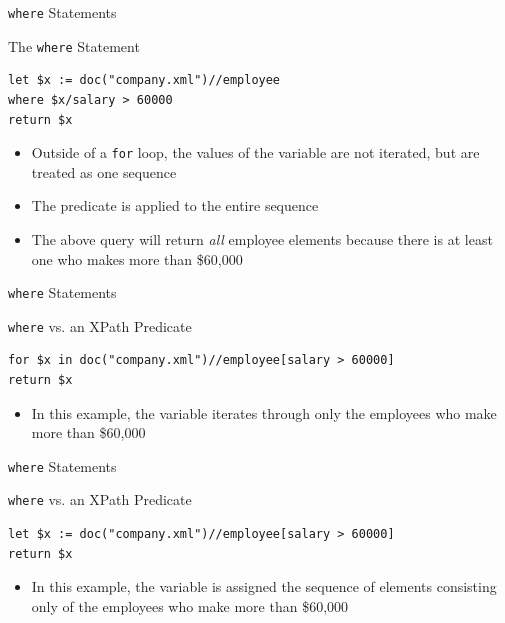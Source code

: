 \documentclass[svgnames]{beamer}
\begin{document}
\begin{frame}[fragile]{\texttt{where} Statements}
\small
\begin{block}{The \texttt{where} Statement}
\begin{verbatim}
let $x := doc("company.xml")//employee
where $x/salary > 60000
return $x
\end{verbatim}
\end{block}
\normalsize
\begin{itemize}
	\item Outside of a \texttt{for} loop, the values of the variable are not iterated, but are treated as one sequence
	\item The predicate is applied to the entire sequence
	\item The above query will return \textit{all} employee elements because there is at least one who makes more than \$60,000
\end{itemize}
\end{frame}

\begin{frame}[fragile]{\texttt{where} Statements}
\small
\begin{block}{\texttt{where} vs. an XPath Predicate}
\begin{verbatim}
for $x in doc("company.xml")//employee[salary > 60000]
return $x
\end{verbatim}
\end{block}
\normalsize
\begin{itemize}
	\item In this example, the variable iterates through only the employees who make more than \$60,000
\end{itemize}
\end{frame}

\begin{frame}[fragile]{\texttt{where} Statements}
\small
\begin{block}{\texttt{where} vs. an XPath Predicate}
\begin{verbatim}
let $x := doc("company.xml")//employee[salary > 60000]
return $x
\end{verbatim}
\end{block}
\normalsize
\begin{itemize}
	\item In this example, the variable is assigned the sequence of elements consisting only of the employees who make more than \$60,000
\end{itemize}
\end{frame}
\end{document}
